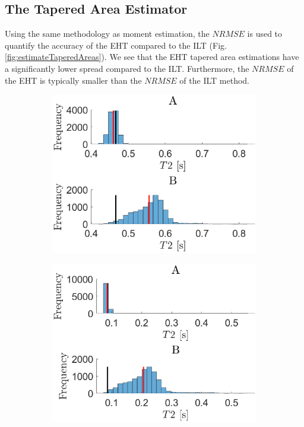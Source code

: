 \subsection {The Tapered Area Estimator}

Using the same methodology as moment estimation, the $NRMSE$ is used to quantify the accuracy of the EHT compared to the ILT (Fig. \ref{fig:estimateTaperedAreas}). We see that the EHT tapered area estimations have a significantly lower spread compared to the ILT. Furthermore, the $NRMSE$ of the EHT is typically smaller than the $NRMSE$ of the ILT method.

\begin{figure}
    \centering
    \begin{subfigure}[b]{0.49\textwidth}
        \includegraphics[width=\textwidth]{backgroundVector/area1e-2.eps}
        \label{fig:estTaperedAreaTc1e-1}
    \end{subfigure}
    \begin{subfigure}[b]{0.49\textwidth}
        \includegraphics[width=\textwidth]{backgroundVector/area1e-1.eps}

\end{subfigure}
\end{figure}
